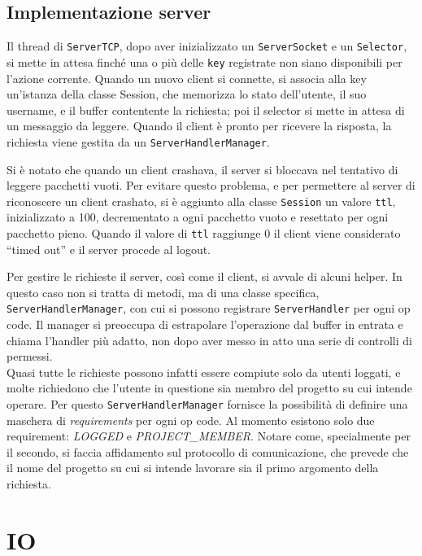 \documentclass[a4paper,11pt] {article}
\begin{document}
\subsection*{Implementazione server}

Il thread di \texttt{ServerTCP}, dopo aver inizializzato un \texttt{ServerSocket} e un \texttt{Selector}, si mette in attesa finché una o più delle \texttt{key} registrate non siano disponibili per l'azione corrente. Quando un nuovo client si connette, si associa alla key un'istanza della classe Session, che memorizza lo stato dell'utente, il suo username, e il buffer contentente la richiesta; poi il selector si mette in attesa di un messaggio da leggere. Quando il client è pronto per ricevere la risposta, la richiesta viene gestita da un \texttt{ServerHandlerManager}.

Si è notato che quando un client crashava, il server si bloccava nel tentativo di leggere pacchetti vuoti. Per evitare questo problema, e per permettere al server di riconoscere un client crashato, si è aggiunto alla classe \texttt{Session} un valore \texttt{ttl}, inizializzato a 100, decrementato a ogni pacchetto vuoto e resettato per ogni pacchetto pieno. Quando il valore di \texttt{ttl} raggiunge 0 il client viene considerato ``timed out'' e il server procede al logout.

Per gestire le richieste il server, così come il client, si avvale di alcuni helper. In questo caso non si tratta di metodi, ma di una classe specifica, \texttt{ServerHandlerManager}, con cui si possono registrare \texttt{ServerHandler} per ogni op code. Il manager si preoccupa di estrapolare l'operazione dal buffer in entrata e chiama l'handler più adatto, non dopo aver messo in atto una serie di controlli di permessi.\\
Quasi tutte le richieste possono infatti essere compiute solo da utenti loggati, e molte richiedono che l'utente in questione sia membro del progetto su cui intende operare. Per questo \texttt{ServerHandlerManager} fornisce la possibilità di definire una maschera di \textit{requirements} per ogni op code. Al momento esistono solo due requirement: \textit{LOGGED} e \textit{PROJECT\_MEMBER}. Notare come, specialmente per il secondo, si faccia affidamento sul protocollo di comunicazione, che prevede che il nome del progetto su cui si intende lavorare sia il primo argomento della richiesta.

\section*{IO}
\end{document}

